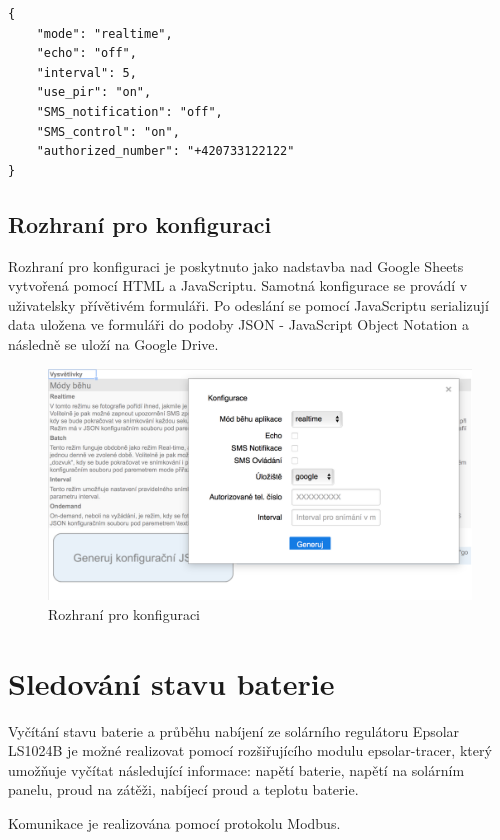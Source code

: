 \begin{verbatim}
{
	"mode": "realtime",
	"echo": "off",
	"interval": 5,
	"use_pir": "on",
	"SMS_notification": "off",
	"SMS_control": "on",
	"authorized_number": "+420733122122"
}
\end{verbatim}

\clearpage
\subsection*{Rozhraní pro konfiguraci}

Rozhraní pro konfiguraci je poskytnuto jako nadstavba nad Google Sheets vytvořená pomocí HTML a JavaScriptu. Samotná konfigurace se provádí v uživatelsky přívětivém formuláři. Po odeslání se pomocí JavaScriptu serializují data uložena ve formuláři do podoby JSON - JavaScript Object Notation a následně se uloží na Google Drive.

\begin{figure}[h]
  \begin{center}
    \includegraphics[scale=0.35]{obrazky/konfigurace.png}
  \end{center}
  \caption{Rozhraní pro konfiguraci}
\end{figure}


\section{Sledování stavu baterie}

Vyčítání stavu baterie a průběhu nabíjení ze solárního regulátoru Epsolar LS1024B je možné realizovat pomocí rozšiřujícího modulu epsolar-tracer, který umožňuje vyčítat následující informace: napětí baterie, napětí na solárním panelu, proud na zátěži, nabíjecí proud a teplotu baterie.

Komunikace je realizována pomocí protokolu Modbus.
\clearpage

